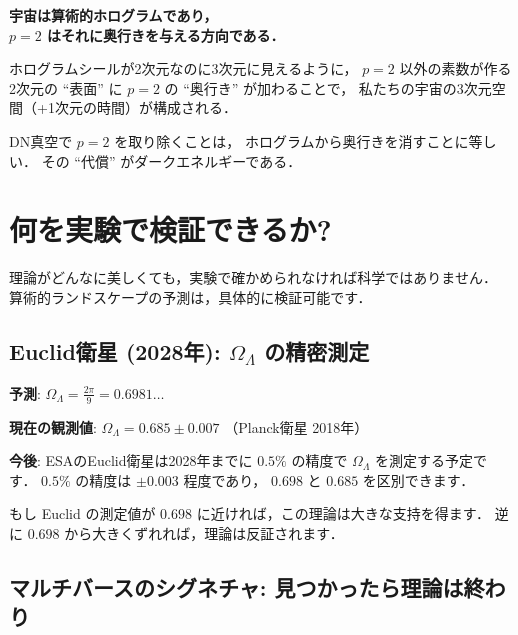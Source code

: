 \documentclass[11pt,a4paper]{article}
\begin{document}
\begin{tcolorbox}[colback=green!5,colframe=green!50!black,title=この章のまとめ]
\begin{center}
\large
\textbf{宇宙は算術的ホログラムであり，\\
$p = 2$ はそれに奥行きを与える方向である．}
\end{center}

\vspace{0.5em}

ホログラムシールが2次元なのに3次元に見えるように，
$p=2$ 以外の素数が作る2次元の ``表面'' に
$p=2$ の ``奥行き'' が加わることで，
私たちの宇宙の3次元空間（+1次元の時間）が構成される．

DN真空で $p=2$ を取り除くことは，
ホログラムから奥行きを消すことに等しい．
その ``代償'' がダークエネルギーである．
\end{tcolorbox}

\section{何を実験で検証できるか?}

理論がどんなに美しくても，実験で確かめられなければ科学ではありません．
算術的ランドスケープの予測は，具体的に検証可能です．

\subsection{Euclid衛星 (2028年): $\Omega_\Lambda$ の精密測定}

\begin{tcolorbox}[colback=blue!5,colframe=blue!50!black]
\textbf{予測}: $\Omega_\Lambda = \frac{2\pi}{9} = 0.6981\ldots$

\textbf{現在の観測値}: $\Omega_\Lambda = 0.685 \pm 0.007$
（Planck衛星 2018年）

\textbf{今後}: ESAのEuclid衛星は2028年までに $0.5\%$ の精度で
$\Omega_\Lambda$ を測定する予定です．
$0.5\%$ の精度は $\pm 0.003$ 程度であり，
$0.698$ と $0.685$ を区別できます．
\end{tcolorbox}

もし Euclid の測定値が $0.698$ に近ければ，この理論は大きな支持を得ます．
逆に $0.698$ から大きくずれれば，理論は反証されます．

\subsection{マルチバースのシグネチャ: 見つかったら理論は終わり}
\end{document}
